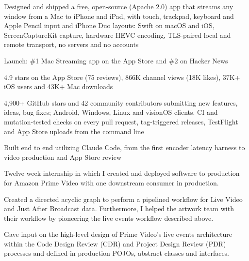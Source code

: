 \documentclass[letterpaper]{deedy-resume} %
\begin{document}
\begin{minipage}[t]{0.66\textwidth}
\begin{tightitemize}
\item Designed and shipped a free, open-source (Apache 2.0) app that streams any window from a Mac to iPhone and iPad, with touch, trackpad, keyboard and Apple Pencil input and iPhone Duo layouts: Swift on macOS and iOS, ScreenCaptureKit capture, hardware HEVC encoding, TLS-paired local and remote transport, no servers and no accounts
\item Launch: \#1 Mac Streaming app on the App Store and \#2 on Hacker News
\item 4.9 stars on the App Store (75 reviews), 866K channel views (18K likes), 37K+ iOS users and 43K+ Mac downloads
\item 4,900+ GitHub stars and 42 community contributors submitting new features, ideas, bug fixes; Android, Windows, Linux and visionOS clients. CI and mutation-tested checks on every pull request, tag-triggered releases, TestFlight and App Store uploads from the command line
\item Built end to end utilizing Claude Code, from the first encoder latency harness to video production and App Store review
\end{tightitemize}
\vspace{\topsep}


\begin{tightitemize}
\item Twelve week internship in which I created and deployed software to production for Amazon Prime Video with one downstream consumer in production.
\item Created a directed acyclic graph to perform a pipelined workflow for Live Video and Just After Broadcast data. Furthermore, I helped the artwork team with their workflow by pioneering the live events workflow described above.
\item Gave input on the high-level design of Prime Video's live events architecture within the Code Design Review (CDR) and Project Design Review (PDR) processes and defined in-production POJOs, abstract classes and interfaces.
\end{tightitemize}

\end{minipage} %
\end{document}
